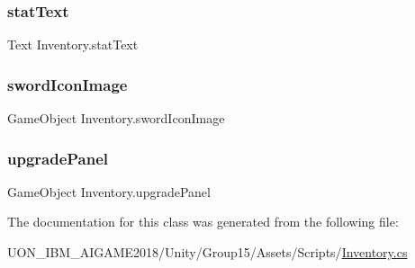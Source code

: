 \subsubsection{\texorpdfstring{statText}{statText}}
{\footnotesize\ttfamily Text Inventory.\+stat\+Text\hspace{0.3cm}{\ttfamily [private]}}

\mbox{\label{class_inventory_af9d04c9febb8280182f03d1ccdc14fa8}} 
\subsubsection{\texorpdfstring{swordIconImage}{swordIconImage}}
{\footnotesize\ttfamily Game\+Object Inventory.\+sword\+Icon\+Image\hspace{0.3cm}{\ttfamily [private]}}

\mbox{\label{class_inventory_a4382ed8c55fa1899bf7a981ffac00523}} 
\subsubsection{\texorpdfstring{upgradePanel}{upgradePanel}}
{\footnotesize\ttfamily Game\+Object Inventory.\+upgrade\+Panel}



The documentation for this class was generated from the following file\+:\begin{DoxyCompactItemize}
\item 
U\+O\+N\+\_\+\+I\+B\+M\+\_\+\+A\+I\+G\+A\+M\+E2018/\+Unity/\+Group15/\+Assets/\+Scripts/\mbox{\hyperlink{_inventory_8cs}{Inventory.\+cs}}\end{DoxyCompactItemize}
